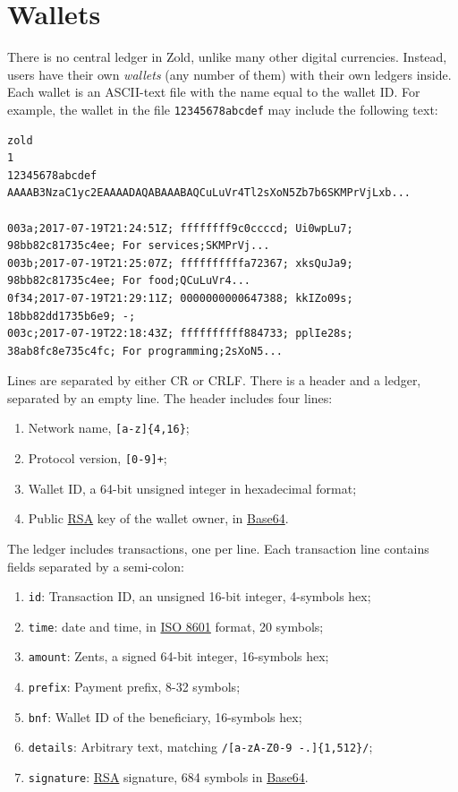\documentclass[11pt,oneside]{article}
\newcommand\dd[1]{\colorbox{gray!30}{\texttt{#1}}}
\begin{document}
\section{Wallets}\label{sec:wallets}

There is no central ledger in Zold, unlike many other digital currencies.
Instead, users have their own \emph{wallets} (any number of them) with their own ledgers inside.
Each wallet is an ASCII-text file with the name equal to the wallet ID.
For example, the wallet in the file \dd{12345678abcdef} may include
the following text:

\begin{verbatim}
zold
1
12345678abcdef
AAAAB3NzaC1yc2EAAAADAQABAAABAQCuLuVr4Tl2sXoN5Zb7b6SKMPrVjLxb...

003a;2017-07-19T21:24:51Z; ffffffff9c0ccccd; Ui0wpLu7; 98bb82c81735c4ee; For services;SKMPrVj...
003b;2017-07-19T21:25:07Z; ffffffffffa72367; xksQuJa9; 98bb82c81735c4ee; For food;QCuLuVr4...
0f34;2017-07-19T21:29:11Z; 0000000000647388; kkIZo09s; 18bb82dd1735b6e9; -;
003c;2017-07-19T22:18:43Z; ffffffffff884733; pplIe28s; 38ab8fc8e735c4fc; For programming;2sXoN5...
\end{verbatim}

Lines are separated by either CR or CRLF.
There is a header and a ledger, separated by an empty line.
The header includes four lines:

\begin{enumerate}
  \item Network name, \dd{[a-z]\{4,16\}};
  \item Protocol version, \dd{[0-9]+};
  \item Wallet ID, a 64-bit unsigned integer in hexadecimal format;
  \item Public \href{https://en.wikipedia.org/wiki/RSA_(cryptosystem)}{RSA}
    key of the wallet owner, in \href{https://en.wikipedia.org/wiki/Base64}{Base64}.
\end{enumerate}

The ledger includes transactions, one per line. Each transaction line
contains fields separated by a semi-colon:

\begin{enumerate}
  \item \dd{id}: Transaction ID, an unsigned 16-bit integer, 4-symbols hex;
  \item \dd{time}: date and time, in \href{https://en.wikipedia.org/wiki/ISO_8601}{ISO 8601} format, 20 symbols;
  \item \dd{amount}: Zents, a signed 64-bit integer, 16-symbols hex;
  \item \dd{prefix}: Payment prefix, 8-32 symbols;
  \item \dd{bnf}: Wallet ID of the beneficiary, 16-symbols hex;
  \item \dd{details}: Arbitrary text, matching \dd{/[a-zA-Z0-9 -.]\{1,512\}/};
  \item \dd{signature}: \href{https://en.wikipedia.org/wiki/RSA_(cryptosystem)}{RSA} signature,
    684 symbols in \href{https://en.wikipedia.org/wiki/Base64}{Base64}.
\end{enumerate}
\end{document}

